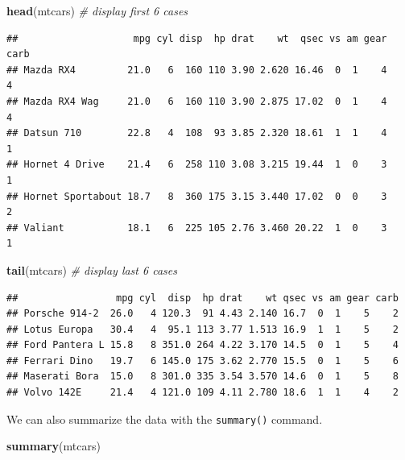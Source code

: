 \documentclass[]{article}
\newenvironment{Shaded}{\begin{snugshade}}{\end{snugshade}}
\newcommand{\KeywordTok}[1]{\textcolor[rgb]{0.13,0.29,0.53}{\textbf{#1}}}
\newcommand{\CommentTok}[1]{\textcolor[rgb]{0.56,0.35,0.01}{\textit{#1}}}
\newcommand{\NormalTok}[1]{#1}
\begin{document}
\begin{Shaded}
\begin{Highlighting}[]
\KeywordTok{head}\NormalTok{(mtcars)  }\CommentTok{# display first 6 cases}
\end{Highlighting}
\end{Shaded}

\begin{verbatim}
##                    mpg cyl disp  hp drat    wt  qsec vs am gear carb
## Mazda RX4         21.0   6  160 110 3.90 2.620 16.46  0  1    4    4
## Mazda RX4 Wag     21.0   6  160 110 3.90 2.875 17.02  0  1    4    4
## Datsun 710        22.8   4  108  93 3.85 2.320 18.61  1  1    4    1
## Hornet 4 Drive    21.4   6  258 110 3.08 3.215 19.44  1  0    3    1
## Hornet Sportabout 18.7   8  360 175 3.15 3.440 17.02  0  0    3    2
## Valiant           18.1   6  225 105 2.76 3.460 20.22  1  0    3    1
\end{verbatim}

\begin{Shaded}
\begin{Highlighting}[]
\KeywordTok{tail}\NormalTok{(mtcars)  }\CommentTok{# display last 6 cases}
\end{Highlighting}
\end{Shaded}

\begin{verbatim}
##                 mpg cyl  disp  hp drat    wt qsec vs am gear carb
## Porsche 914-2  26.0   4 120.3  91 4.43 2.140 16.7  0  1    5    2
## Lotus Europa   30.4   4  95.1 113 3.77 1.513 16.9  1  1    5    2
## Ford Pantera L 15.8   8 351.0 264 4.22 3.170 14.5  0  1    5    4
## Ferrari Dino   19.7   6 145.0 175 3.62 2.770 15.5  0  1    5    6
## Maserati Bora  15.0   8 301.0 335 3.54 3.570 14.6  0  1    5    8
## Volvo 142E     21.4   4 121.0 109 4.11 2.780 18.6  1  1    4    2
\end{verbatim}

We can also summarize the data with the \texttt{summary()} command.

\begin{Shaded}
\begin{Highlighting}[]
\KeywordTok{summary}\NormalTok{(mtcars)}
\end{Highlighting}
\end{Shaded}
\end{document}
